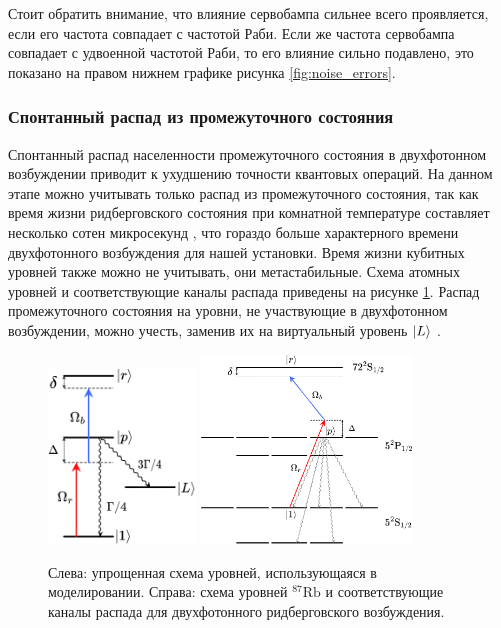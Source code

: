 Стоит обратить внимание, что влияние сервобампа сильнее всего проявляется, если его частота совпадает с частотой Раби. Если же частота сервобампа совпадает с удвоенной частотой Раби, то его влияние сильно подавлено, это показано на правом нижнем графике рисунка \ref{fig:noise_errors}.

\subsubsection{Спонтанный распад из промежуточного состояния}

Спонтанный распад населенности промежуточного состояния в двухфотонном возбуждении приводит к ухудшению точности квантовых операций. На данном этапе можно учитывать только распад из промежуточного состояния, так как время жизни ридберговского состояния при комнатной температуре составляет несколько сотен микросекунд \cite{Ryabtsev_BBR}, что гораздо больше характерного времени двухфотонного возбуждения для нашей установки. Время жизни кубитных уровней также можно не учитывать, они метастабильные. Схема атомных уровней и соответствующие каналы распада приведены на рисунке \ref{fig:atom_scheme}. Распад промежуточного состояния на уровни, не участвующие в двухфотонном возбуждении, можно учесть, заменив их на виртуальный уровень $\left| L \right\rangle$ \cite{Browayes}.

\begin{figure}[ht]
	\centering
	\includegraphics[width=0.35\textwidth]{images/ModelScheme.pdf}
	\hspace{2em}
	\includegraphics[width=0.5\textwidth]{images/AtomScheme.pdf}
	\caption{Слева: упрощенная схема уровней, использующаяся в моделировании. Справа: схема уровней $^{87}\text{Rb}$ и соответствующие каналы распада для двухфотонного ридберговского возбуждения.}
	\label{fig:atom_scheme}
\end{figure}


